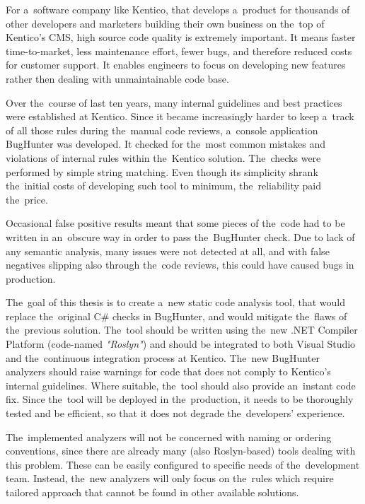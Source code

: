 \documentclass[
  digital, %
  table,   %
  lof,     %
  lot,     %
  oneside,
]{fithesis3}
\begin{document}
For a~software company like Kentico, that develops a~product for thousands of other developers and marketers building their own business on the~top of Kentico's CMS, high source code quality is extremely important. It means faster time-to-market, less maintenance effort, fewer bugs, and therefore reduced costs for customer support. It enables engineers to focus on developing new features rather then dealing with unmaintainable code base. 


Over the~course of last ten years, many internal guidelines and best practices were established at Kentico. Since it became increasingly harder to keep a~track of all those rules during the~manual code reviews, a~console application BugHunter was developed. It checked for the~most common mistakes and violations of internal rules within the~Kentico solution. The~checks were performed by simple string matching. Even though its simplicity shrank the~initial costs of developing such tool to minimum, the~reliability paid the~price. 

Occasional false positive results meant that some pieces of the~code had to be written in an~obscure way in order to pass the~BugHunter check. Due to lack of any semantic analysis, many issues were not detected at all, and with false negatives slipping also through the~code reviews, this could have caused bugs in production. 

The~goal of this thesis is to create a~new static code analysis tool, that would replace the~original C\# checks in BugHunter, and would mitigate the~flaws of the~previous solution. The~tool should be written using the~new .NET Compiler Platform (code-named \textit{"Roslyn"}) and should be integrated to both Visual Studio and the~continuous integration process at Kentico. The~new BugHunter analyzers should raise warnings for code that does not comply to Kentico's internal guidelines. Where suitable, the~tool should also provide an~instant code fix. Since the~tool will be deployed in the~production, it needs to be thoroughly tested and be efficient, so that it does not degrade the~developers' experience.

The~implemented analyzers will not be concerned with naming or ordering conventions, since there are already many (also Roslyn-based) tools dealing with this problem. These can be easily configured to specific needs of the~development team. Instead, the~new analyzers will only focus on the~rules which require tailored approach that cannot be found in other available solutions. 
\end{document}
